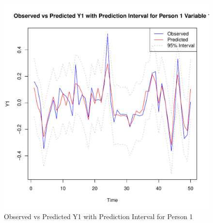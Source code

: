 \documentclass{article}
\begin{document}
\begin{figure}[h]
  \centering
  \includegraphics[width=\textwidth]{prediction_intervals_y1.pdf}
  \caption{Observed vs Predicted Y1 with Prediction Interval for Person 1}
\end{figure}
\end{document}
